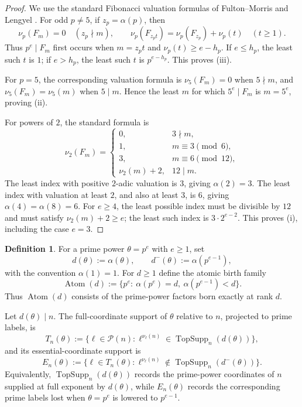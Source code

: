 \documentclass[11pt,letterpaper]{article}
\numberwithin{equation}{section}
\theoremstyle{plain}
\theoremstyle{definition}
\newtheorem{definition}[theorem]{Definition}
\theoremstyle{remark}
\DeclareMathOperator{\Atom}{Atom}
\DeclareMathOperator{\TopSupp}{TopSupp}
\begin{document}
\begin{proof}
We use the standard Fibonacci valuation formulas of
Fulton--Morris \cite{FultonMorris1969ArithmeticalFunctions} and
Lengyel \cite{Lengyel1995OrderFibonacciLucas}.  For odd \(p\ne5\), if
\(z_p=\alpha(p)\), then
\[
\nu_p(F_m)=0\quad(z_p\nmid m),
\qquad
\nu_p(F_{z_pt})=\nu_p(F_{z_p})+\nu_p(t)\quad(t\ge1).
\]
Thus \(p^e\mid F_m\) first occurs when \(m=z_pt\) and
\(\nu_p(t)\ge e-h_p\).  If \(e\le h_p\), the least such \(t\) is \(1\); if
\(e>h_p\), the least such \(t\) is \(p^{e-h_p}\). This proves (iii).

For \(p=5\), the corresponding valuation formula is
\(\nu_5(F_m)=0\) when \(5\nmid m\), and
\(\nu_5(F_m)=\nu_5(m)\) when \(5\mid m\). Hence the least \(m\) for which
\(5^e\mid F_m\) is \(m=5^e\), proving (ii).

For powers of \(2\), the standard formula is
\[
\nu_2(F_m)=
\begin{cases}
0,&3\nmid m,\\
1,&m\equiv3\pmod 6,\\
3,&m\equiv6\pmod {12},\\
\nu_2(m)+2,&12\mid m.
\end{cases}
\]
The least index with positive \(2\)-adic valuation is \(3\), giving
\(\alpha(2)=3\).  The least index with valuation at least \(2\), and also at
least \(3\), is \(6\), giving \(\alpha(4)=\alpha(8)=6\).  For \(e\ge4\), the
least possible index must be divisible by \(12\) and must satisfy
\(\nu_2(m)+2\ge e\); the least such index is \(3\cdot2^{e-2}\). This proves
(i), including the case \(e=3\).
\end{proof}

\begin{definition}\label{def:atomic-families}
For a prime power \(\theta=p^e\) with \(e\ge1\), set
\[
d(\theta):=\alpha(\theta),\qquad
d^-(\theta):=\alpha(p^{e-1}),
\]
with the convention \(\alpha(1)=1\). For \(d\ge1\) define the atomic
birth family
\[
\Atom(d):=\{p^e:\ \alpha(p^e)=d,\ \alpha(p^{e-1})<d\}.
\]
Thus \(\Atom(d)\) consists of the prime-power factors born exactly at rank
\(d\).

Let \(d(\theta)\mid n\). The full-coordinate support of \(\theta\) relative
to \(n\), projected to prime labels, is
\[
T_n(\theta):=
\{\ell\in\mathcal P(n):\ell^{\nu_\ell(n)}\in\TopSupp_n(d(\theta))\},
\]
and its essential-coordinate support is
\[
E_n(\theta):=
\{\ell\in T_n(\theta):
\ell^{\nu_\ell(n)}\notin\TopSupp_n(d^-(\theta))\}.
\]
Equivalently, \(\TopSupp_n(d(\theta))\) records the prime-power coordinates of
\(n\) supplied at full exponent by \(d(\theta)\), while \(E_n(\theta)\) records
the corresponding prime labels lost when \(\theta=p^e\) is lowered to
\(p^{e-1}\).
\end{definition}
\end{document}
